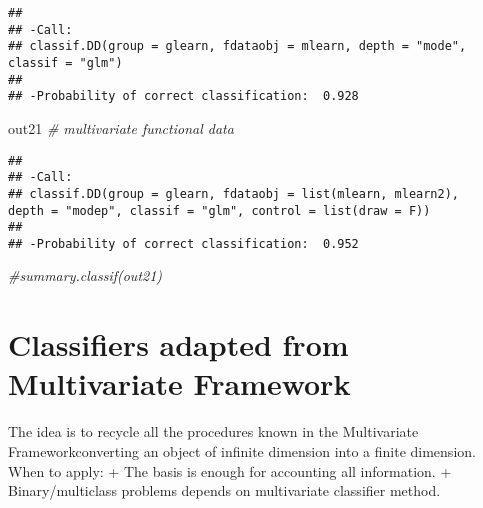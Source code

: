 \documentclass[
]{book}
\newenvironment{Shaded}{\begin{snugshade}}{\end{snugshade}}
\newcommand{\AttributeTok}[1]{\textcolor[rgb]{0.77,0.63,0.00}{#1}}
\newcommand{\CommentTok}[1]{\textcolor[rgb]{0.56,0.35,0.01}{\textit{#1}}}
\newcommand{\FunctionTok}[1]{\textcolor[rgb]{0.00,0.00,0.00}{#1}}
\newcommand{\NormalTok}[1]{#1}
\newcommand{\OtherTok}[1]{\textcolor[rgb]{0.56,0.35,0.01}{#1}}
\newcommand{\SpecialCharTok}[1]{\textcolor[rgb]{0.00,0.00,0.00}{#1}}
\newcommand{\StringTok}[1]{\textcolor[rgb]{0.31,0.60,0.02}{#1}}
\begin{document}
\begin{verbatim}
## 
## -Call:
## classif.DD(group = glearn, fdataobj = mlearn, depth = "mode",     classif = "glm")
## 
## -Probability of correct classification:  0.928
\end{verbatim}

\begin{Shaded}
\begin{Highlighting}[]
\NormalTok{out21 }\CommentTok{\# multivariate functional data}
\end{Highlighting}
\end{Shaded}

\begin{verbatim}
## 
## -Call:
## classif.DD(group = glearn, fdataobj = list(mlearn, mlearn2),     depth = "modep", classif = "glm", control = list(draw = F))
## 
## -Probability of correct classification:  0.952
\end{verbatim}

\begin{Shaded}
\begin{Highlighting}[]
\CommentTok{\#summary.classif(out21)}
\end{Highlighting}
\end{Shaded}

\hypertarget{classifiers-adapted-from-multivariate-framework}{%
\section{Classifiers adapted from Multivariate Framework}\label{classifiers-adapted-from-multivariate-framework}}

The idea is to recycle all the procedures known in the Multivariate Frameworkconverting an object of infinite dimension into a finite dimension.
When to apply:
+ The basis is enough for accounting all information.
+ Binary/multiclass problems depends on multivariate classifier method.

\begin{Shaded}
\end{Shaded}
\end{document}
